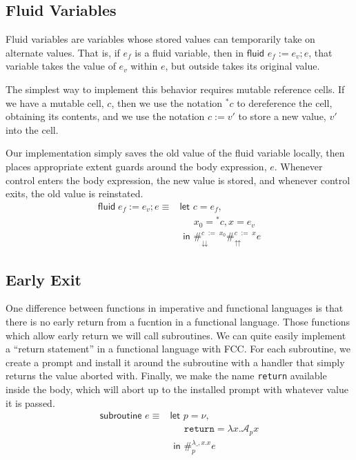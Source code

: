 \documentclass[11pt]{article}
\newcommand{\maybePage}{\newpage}
\newcommand\x{\lambda x}
\newcommand{\letin}[2]{\textsf{let }#1\textsf{ in }#2}
\newcommand\A{\mathcal{A}}
\begin{document}
%

\maybePage
\subsection{Fluid Variables}

Fluid variables are variables whose stored values can temporarily take on alternate values.
That is, if $e_f$ is a fluid variable, then in $\textsf{fluid }e_f := e_v; e$, that variable takes the value of $e_v$ within $e$, but outside takes its original value.

The simplest way to implement this behavior requires mutable reference cells.
If we have a mutable cell, $c$, then we use the notation $^*c$ to dereference the cell, obtaining its contents, and we use the notation $c := v'$ to store a new value, $v'$ into the cell.

Our implementation simply saves the old value of the fluid variable locally, then places appropriate extent guards around the body expression, $e$.
Whenever control enters the body expression, the new value is stored, and whenever control exits, the old value is reinstated.
\begin{align*}
\textsf{fluid}\;e_f:=e_v;e \equiv{}
	&\letin{c = e_f, \\
	&\quad\;\, x_0 = {}^*c, x = e_v \\
	&}{
	\#_\downdownarrows^{c\;:=\;x_0}\#_\upuparrows^{c\;:=\;x}}e
\end{align*}

\maybePage
\subsection{Early Exit}

One difference between functions in imperative and functional languages is that there is no early return from a fucntion in a functional language.
Those functions which allow early return we will call subroutines.
We can quite easily implement a ``return statement'' in a functional language with FCC.
For each subroutine, we create a prompt and install it around the subroutine with a handler that simply returns the value aborted with.
Finally, we make the name \texttt{return} available inside the body, which will abort up to the installed prompt with whatever value it is passed.
\begin{align*}
\textsf{subroutine }e \equiv{}
	&\letin{p=\nu, \\
	&\quad\;\, \texttt{return}=\x.\A_px \\
	&}{
	\#_p^{\lambda \_,x.x}e}
\end{align*}
\end{document}
